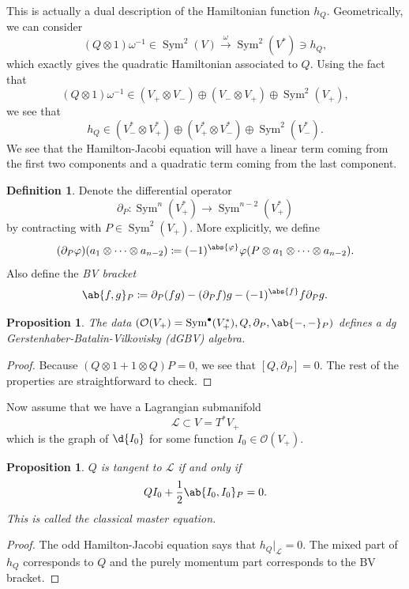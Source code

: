 \documentclass{amsart}
\newtheorem{prop}[thm]{Proposition}
\theoremstyle{definition}
\newtheorem{defn}[thm]{Definition}
\theoremstyle{remark}
\theoremstyle{plain}
\theoremstyle{definition}
\theoremstyle{remark}
\newcommand{\mc}[1]{\mathcal{#1}}
\newcommand{\on}[1]{\operatorname{#1}}
\newcommand{\1}{\mathbf{1}}
\newcommand{\2}{\mathbf{2}}
\newcommand{\3}{\mathbf{3}}
\DeclareMathOperator{\Sym}{Sym}
\begin{document}
This is actually a dual description of the Hamiltonian function \(h_Q\). Geometrically, we can consider
\[ (Q \otimes 1) \omega^{-1} \in \on{Sym}^2(V) \xrightarrow{\omega} \on{Sym}^2(V^*) \ni h_Q, \]
which exactly gives the quadratic Hamiltonian associated to \(Q\). Using the fact that
\[ (Q \otimes 1) \omega^{-1} \in (V_+ \otimes V_-) \oplus (V_- \otimes V_+) \oplus \on{Sym}^2(V_+), \]
we see that
\[ h_Q \in (V_-^* \otimes V_+^*) \oplus (V_+^* \otimes V_-^*) \oplus \on{Sym}^2(V_-^*). \]
We see that the Hamilton-Jacobi equation will have a linear term coming from the first two components and a quadratic term coming from the last component.

\begin{defn}
    Denote the differential operator
    \[ \partial_P \colon \on{Sym}^n(V_+^*) \to \on{Sym}^{n-2}(V_+^*) \]
    by contracting with \(P \in \on{Sym}^2(V_+)\). More explicitly, we define
    \[ (\partial_P \varphi)(a_1 \otimes \cdots \otimes a_{n-2}) \coloneqq (-1)^{\abs{\varphi}} \varphi(P \otimes a_1 \otimes \cdots \otimes a_{n-2}). \]
    Also define the \textit{BV bracket}
    \[ \ab\{ f, g\}_P \coloneqq \partial_P(fg) - (\partial_P f) g - (-1)^{\abs{f}} f \partial_P g. \]
\end{defn}

\begin{prop}
    The data \((\mc{O}(V_+) = \Sym^{\bullet}(V_+^*), Q, \partial_P, \ab\{-,-\}_P)\) defines a dg Gerstenhaber-Batalin-Vilkovisky (dGBV) algebra.
\end{prop}

\begin{proof}
    Because \((Q \otimes 1 + 1 \otimes Q)P = 0\), we see that \([Q, \partial_P] = 0\). The rest of the properties are straightforward to check.
\end{proof}

Now assume that we have a Lagrangian submanifold
\[ \mc{L} \subset V = T^* V_+ \]
which is the graph of \(\d{I_0}\) for some function \(I_0 \in \mc{O}(V_+)\).
\begin{prop}
    \(Q\) is tangent to \(\mc{L}\) if and only if
    \[ Q I_0 + \frac{1}{2} \ab\{I_0, I_0\}_P = 0. \]
    This is called the \textit{classical master equation}.
\end{prop}

\begin{proof}
    The odd Hamilton-Jacobi equation says that \(h_Q |_{\mc{L}} = 0\). The mixed part of \(h_Q\) corresponds to \(Q\) and the purely momentum part corresponds to the BV bracket. 
\end{proof}
\end{document}
